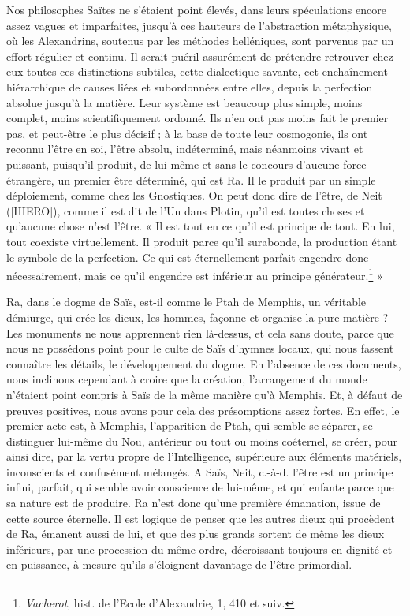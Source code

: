 \documentclass[a4paper, 11pt, oneside]{article}
\begin{document}
Nos philosophes Saïtes ne s'étaient point élevés, dans leurs spéculations encore assez vagues et imparfaites, jusqu'à ces hauteurs de l'abstraction métaphysique, où les Alexandrins, soutenus par les méthodes helléniques, sont parvenus par un effort régulier et continu. Il serait puéril assurément de prétendre retrouver chez eux toutes ces distinctions subtiles, cette dialectique savante, cet enchaînement hiérarchique de causes liées et subordonnées entre elles, depuis la perfection absolue jusqu'à la matière. Leur système est beaucoup plus simple, moins complet, moins scientifiquement ordonné. Ils n'en ont pas moins fait le premier pas, et peut-être le plus décisif ; à la base de toute leur cosmogonie, ils ont reconnu l'être en soi, l'être absolu, indéterminé, mais néanmoins vivant et puissant, puisqu'il produit, de lui-même et sans le concours d'aucune force étrangère, un premier être déterminé, qui est Ra. Il le produit par un simple déploiement, comme chez les Gnostiques. On peut donc dire de l'être, de Neit ([HIERO]), comme il est dit de l'Un dans Plotin, qu'il est toutes choses et qu'aucune chose n'est l'être. « Il est tout en ce qu'il est principe de tout. En lui, tout coexiste virtuellement. Il produit parce qu’il surabonde, la production étant le symbole de la perfection. Ce qui est éternellement parfait engendre donc nécessairement, mais ce qu'il engendre est inférieur au principe générateur.\footnote{\emph{Vacherot}, hist. de l'Ecole d'Alexandrie, 1, 410 et suiv.} »

Ra, dans le dogme de Saïs, est-il comme le Ptah de Memphis, un véritable démiurge, qui crée les dieux, les hommes, façonne et organise la pure matière ? Les monuments ne nous apprennent rien là-dessus, et cela sans doute, parce que nous ne possédons point pour le culte de Saïs d'hymnes locaux, qui nous fassent connaître les détails, le développement du dogme. En l'absence de ces documents, nous inclinons cependant à croire que la création, l'arrangement du monde n'étaient point compris à Saïs de la même manière qu'à Memphis. Et, à défaut de preuves positives, nous avons pour cela des présomptions assez fortes. En effet, le premier acte est, à Memphis, l'apparition de Ptah, qui semble se séparer, se distinguer lui-même du Nou, antérieur ou tout ou moins coéternel, se créer, pour ainsi dire, par la vertu propre de l'Intelligence, supérieure aux éléments matériels, inconscients et confusément mélangés. A Saïs, Neit, c.-à-d. l'être est un principe infini, parfait, qui semble avoir conscience de lui-même, et qui enfante parce que sa nature est de produire. Ra n'est donc qu'une première émanation, issue de cette source éternelle. Il est logique de penser que les autres dieux qui procèdent de Ra, émanent aussi de lui, et que des plus grands sortent de même les dieux inférieurs, par une procession du même ordre, décroissant toujours en dignité et en puissance, à mesure qu'ils s'éloignent davantage de l'être primordial.
\end{document}
